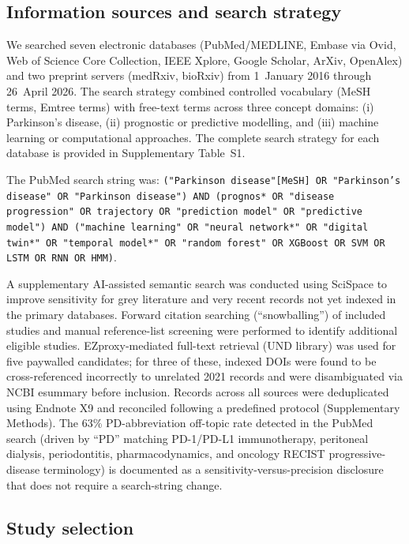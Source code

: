 \subsection{Information sources and search strategy}
\label{sr:sec:methods:search}

We searched seven electronic databases (PubMed/MEDLINE, Embase via Ovid, Web of Science Core Collection, IEEE Xplore, Google Scholar, ArXiv, OpenAlex) and two preprint servers (medRxiv, bioRxiv) from 1~January 2016 through 26~April 2026. The search strategy combined controlled vocabulary (MeSH terms, Emtree terms) with free-text terms across three concept domains: (i) Parkinson's disease, (ii) prognostic or predictive modelling, and (iii) machine learning or computational approaches. The complete search strategy for each database is provided in Supplementary Table~S1.

The PubMed search string was: \texttt{("Parkinson disease"[MeSH] OR "Parkinson's disease" OR "Parkinson disease") AND (prognos* OR "disease progression" OR trajectory OR "prediction model" OR "predictive model") AND ("machine learning" OR "neural network*" OR "digital twin*" OR "temporal model*" OR "random forest" OR XGBoost OR SVM OR LSTM OR RNN OR HMM)}.

A supplementary AI-assisted semantic search was conducted using SciSpace to improve sensitivity for grey literature and very recent records not yet indexed in the primary databases. Forward citation searching (``snowballing'') of included studies and manual reference-list screening were performed to identify additional eligible studies. EZproxy-mediated full-text retrieval (UND library) was used for five paywalled candidates; for three of these, indexed DOIs were found to be cross-referenced incorrectly to unrelated 2021 records and were disambiguated via NCBI esummary before inclusion. Records across all sources were deduplicated using Endnote X9 and reconciled following a predefined protocol (Supplementary Methods). The 63\% PD-abbreviation off-topic rate detected in the PubMed search (driven by ``PD'' matching PD-1/PD-L1 immunotherapy, peritoneal dialysis, periodontitis, pharmacodynamics, and oncology RECIST progressive-disease terminology) is documented as a sensitivity-versus-precision disclosure that does not require a search-string change.

\subsection{Study selection}
\label{sr:sec:methods:selection}

